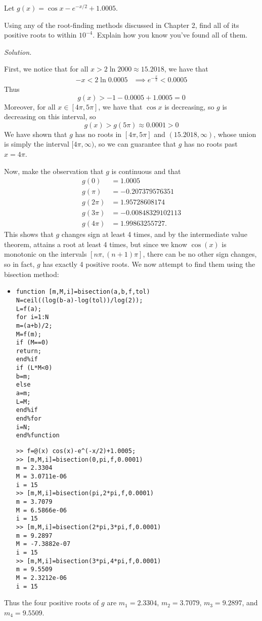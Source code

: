 \documentclass{eh-homework}
\begin{document}
    \begin{question}{5}
    Let \(g(x) = \cos x - e^{-x/2} + 1.0005\).
    
    Using any of the root-finding methods discussed in Chapter 2, find all of its positive roots to within \(10^{-4}\). Explain how you know you’ve found all of them.

    \textit{Solution.}

    First, we notice that for all \(x > 2\ln 2000 \approx 15.2018\), we have that
    \begin{align*}
        -x < 2\ln 0.0005 &\implies e^{-\frac{x}{2}} < 0.0005
    \end{align*}
    Thus
    \[
        g(x) > -1 - 0.0005 + 1.0005 = 0
    \]
    Moreover, for all \(x \in [4\pi , 5\pi]\), we have that \(\cos x\) is decreasing, so \(g\) is decreasing on this interval, so
    \[
        g(x) > g(5\pi) \approx 0.0001 > 0
    \]
    We have shown that \(g\) has no roots in \([4\pi ,5\pi ]\) and \((15.2018, \infty)\), whose union is simply the interval \([4\pi ,\infty)\), so we can guarantee that \(g\) has no roots past \(x = 4\pi\).

    Now, make the observation that \(g\) is continuous and that
    \begin{align*}
        g(0) &= 1.0005 \\
        g(\pi) &= -0.207379576351 \\
        g(2 \pi) &= 1.95728608174 \\
        g(3\pi) &= -0.00848329102113 \\
        g(4\pi) &= 1.99863255727.
    \end{align*}
    This shows that \(g\) changes sign at least 4 times, and by the intermediate value theorem, attains a root at least 4 times, but since we know \(\cos (x)\) is monotonic on the intervals \([n \pi , (n+1)\pi]\), there can be no other sign changes, so in fact, \(g\) has exactly 4 positive roots. We now attempt to find them using the bisection method:
    \begin{itemize}
        \item[]
        \begin{lstlisting}
function [m,M,i]=bisection(a,b,f,tol)
N=ceil((log(b-a)-log(tol))/log(2));
L=f(a);
for i=1:N
m=(a+b)/2;
M=f(m);
if (M==0)
return;
end%if
if (L*M<0)
b=m;
else
a=m;
L=M;
end%if
end%for
i=N;
end%function
        \end{lstlisting}
        \begin{lstlisting}[numbers=none]
>> f=@(x) cos(x)-e^(-x/2)+1.0005;
>> [m,M,i]=bisection(0,pi,f,0.0001)
m = 2.3304
M = 3.0711e-06
i = 15
>> [m,M,i]=bisection(pi,2*pi,f,0.0001)
m = 3.7079
M = 6.5866e-06
i = 15
>> [m,M,i]=bisection(2*pi,3*pi,f,0.0001)
m = 9.2897
M = -7.3882e-07
i = 15
>> [m,M,i]=bisection(3*pi,4*pi,f,0.0001)
m = 9.5509
M = 2.3212e-06
i = 15
        \end{lstlisting}
    \end{itemize}
    Thus the four positive roots of \(g\) are \(m_1 = 2.3304\), \(m_2 = 3.7079\), \(m_3 = 9.2897\), and \(m_4 = 9.5509\).
    \end{question}
\end{document}
